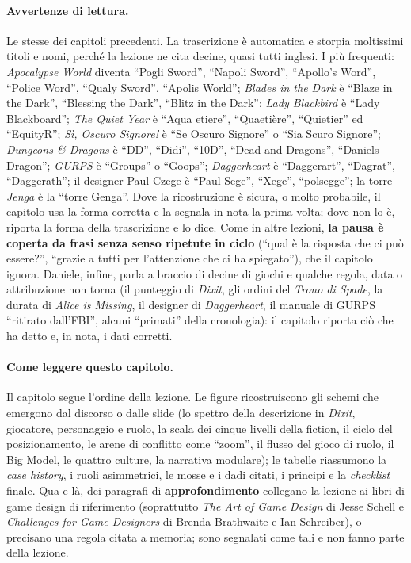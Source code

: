 \paragraph{Avvertenze di lettura.} Le stesse dei capitoli precedenti. La trascrizione è
automatica e storpia moltissimi titoli e nomi, perché la lezione ne cita decine, quasi tutti
inglesi. I più frequenti: \emph{Apocalypse World} diventa ``Pogli Sword'', ``Napoli Sword'',
``Apollo's Word'', ``Police Word'', ``Qualy Sword'', ``Apolis World''; \emph{Blades in the
Dark} è ``Blaze in the Dark'', ``Blessing the Dark'', ``Blitz in the Dark''; \emph{Lady
Blackbird} è ``Lady Blackboard''; \emph{The Quiet Year} è ``Aqua etiere'', ``Quaetière'',
``Quietier'' ed ``EquityR''; \emph{Sì, Oscuro Signore!} è ``Se Oscuro Signore'' o ``Sia Scuro
Signore''; \emph{Dungeons \& Dragons} è ``DD'', ``Didi'', ``10D'', ``Dead and Dragons'',
``Daniels Dragon''; \emph{GURPS} è ``Groups'' o ``Goops''; \emph{Daggerheart} è ``Daggerart'',
``Dagrat'', ``Daggerath''; il designer Paul Czege è ``Paul Sege'', ``Xege'', ``polsegge''; la
torre \emph{Jenga} è la ``torre Genga''. Dove la ricostruzione è sicura, o molto probabile, il
capitolo usa la forma corretta e la segnala in nota la prima volta; dove non lo è, riporta la
forma della trascrizione e lo dice. Come in altre lezioni, \textbf{la pausa è coperta da frasi
senza senso ripetute in ciclo} (``qual è la risposta che ci può essere?'', ``grazie a tutti per
l'attenzione che ci ha spiegato''), che il capitolo ignora. Daniele, infine, parla a braccio di
decine di giochi e qualche regola, data o attribuzione non torna (il punteggio di
\emph{Dixit}, gli ordini del \emph{Trono di Spade}, la durata di \emph{Alice is Missing}, il
designer di \emph{Daggerheart}, il manuale di GURPS ``ritirato dall'FBI'', alcuni ``primati''
della cronologia): il capitolo riporta ciò che ha detto e, in nota, i dati corretti.

\paragraph{Come leggere questo capitolo.} Il capitolo segue l'ordine della lezione. Le figure
ricostruiscono gli schemi che emergono dal discorso o dalle slide (lo spettro della
descrizione in \emph{Dixit}, giocatore, personaggio e ruolo, la scala dei cinque livelli della
fiction, il ciclo del posizionamento, le arene di conflitto come ``zoom'', il flusso del gioco
di ruolo, il Big Model, le quattro culture, la narrativa modulare); le tabelle riassumono la
\emph{case history}, i ruoli asimmetrici, le mosse e i dadi citati, i principi e la
\emph{checklist} finale. Qua e là, dei paragrafi di \textbf{approfondimento} collegano la
lezione ai libri di game design di riferimento (soprattutto \emph{The Art of Game Design} di
Jesse Schell e \emph{Challenges for Game Designers} di Brenda Brathwaite e Ian Schreiber), o
precisano una regola citata a memoria; sono segnalati come tali e non fanno parte della
lezione.

